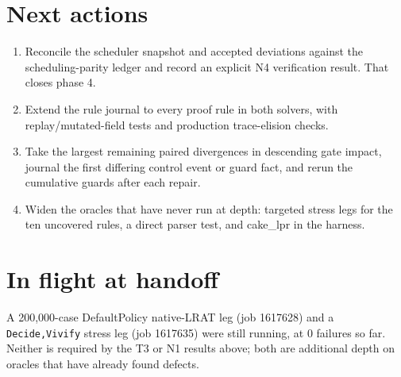 \documentclass[11pt]{article}
\newcommand{\code}[1]{\texttt{#1}}
\begin{document}
\section*{Next actions}
\begin{enumerate}
\item Reconcile the scheduler snapshot and accepted deviations against the
scheduling-parity ledger and record an explicit N4 verification result.  That
closes phase 4.
\item Extend the rule journal to every proof rule in both solvers, with
replay/mutated-field tests and production trace-elision checks.
\item Take the largest remaining paired divergences in descending gate impact,
journal the first differing control event or guard fact, and rerun the
cumulative guards after each repair.
\item Widen the oracles that have never run at depth: targeted stress legs for
the ten uncovered rules, a direct parser test, and cake\_lpr in the harness.
\end{enumerate}

\section*{In flight at handoff}
A 200{,}000-case DefaultPolicy native-LRAT leg (job 1617628) and a
\code{Decide,Vivify} stress leg (job 1617635) were still running, at 0 failures
so far.  Neither is required by the T3 or N1 results above; both are additional
depth on oracles that have already found defects.
\end{document}
